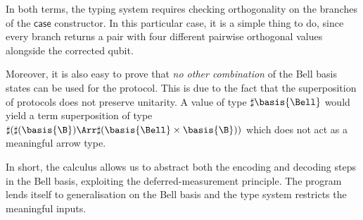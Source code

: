 In both terms, the typing system requires checking orthogonality on the branches of
the $\mathsf{case}$ constructor. In this particular case, it is a simple thing to 
do, since every branch returns a pair with four different pairwise orthogonal values
alongside the corrected qubit. 

Moreover, it is also easy to prove that \emph{no other combination} of the Bell 
basis states can be used for the protocol. This is due to the fact that the 
superposition of protocols does not preserve unitarity. A value of type 
$\sharp\basis{\Bell}$ would yield a term superposition of type $\sharp(\sharp 
(\basis{\B})\Arr\sharp (\basis{\Bell}\times\basis{\B}))$ which does not act as a 
meaningful arrow type.

In short, the calculus allows us to abstract both the encoding and decoding
steps in the Bell basis, exploiting the deferred-measurement principle. The program 
lends itself to generalisation on the Bell basis and the type system restricts the meaningful inputs.
